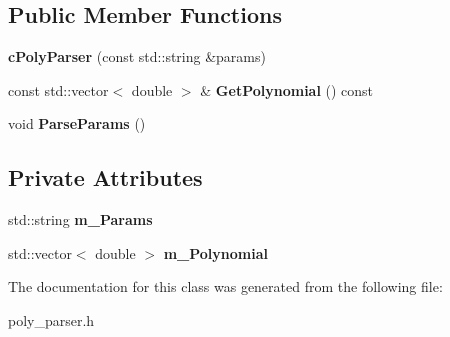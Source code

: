 \subsection*{Public Member Functions}
\begin{DoxyCompactItemize}
\item 
\hypertarget{classengine_1_1cPolyParser_a1dc22293d806af7089fc5d62211f6cde}{{\bfseries c\-Poly\-Parser} (const std\-::string \&params)}\label{classengine_1_1cPolyParser_a1dc22293d806af7089fc5d62211f6cde}

\item 
\hypertarget{classengine_1_1cPolyParser_a3e27beb56f6de5b3739cd2449d9bc378}{const std\-::vector$<$ double $>$ \& {\bfseries Get\-Polynomial} () const }\label{classengine_1_1cPolyParser_a3e27beb56f6de5b3739cd2449d9bc378}

\item 
\hypertarget{classengine_1_1cPolyParser_a218c72ada611be2894e43c4a1e5e7f14}{void {\bfseries Parse\-Params} ()}\label{classengine_1_1cPolyParser_a218c72ada611be2894e43c4a1e5e7f14}

\end{DoxyCompactItemize}
\subsection*{Private Attributes}
\begin{DoxyCompactItemize}
\item 
\hypertarget{classengine_1_1cPolyParser_abf3d16e29f0d19c56db195e42876f41d}{std\-::string {\bfseries m\-\_\-\-Params}}\label{classengine_1_1cPolyParser_abf3d16e29f0d19c56db195e42876f41d}

\item 
\hypertarget{classengine_1_1cPolyParser_a4468e81a2f9a64a2b55ae3e5f9797c2f}{std\-::vector$<$ double $>$ {\bfseries m\-\_\-\-Polynomial}}\label{classengine_1_1cPolyParser_a4468e81a2f9a64a2b55ae3e5f9797c2f}

\end{DoxyCompactItemize}


The documentation for this class was generated from the following file\-:\begin{DoxyCompactItemize}
\item 
poly\-\_\-parser.\-h\end{DoxyCompactItemize}
